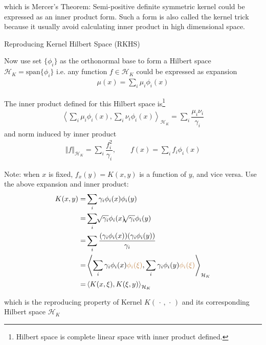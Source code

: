     which is Mercer's Theorem: Semi-positive definite symmetric kernel could be expressed as an inner product form. Such a form is also called the kernel trick because it usually avoid calculating inner product in high dimensional space.
    
\begin{point}
    Reproducing Kernel Hilbert Space (RKHS)
\end{point}
    Now use set $ \{\phi _i\} $ as the orthonormal base to form a Hilbert space $ \mathcal{H}_K=\mathrm{span}\{\phi _i\}  $ i.e. any function $ f\in\mathcal{H}_K $ could be expressed as expansion
    \begin{align}
        \mu (x)=\sum_{i} \mu _i\phi _i(x)
    \end{align}

    The inner product defined for this Hilbert space is\footnote{Hilbert space is complete linear space with inner product defined.}
    \begin{align}
        \left\langle \sum_{i}\mu _i\phi _i(x), \sum_{i}\nu _i\phi _i(x)\right\rangle _{\mathcal{H}_K} = \sum_{i}\dfrac{\mu _i\nu _i}{\gamma _i}
    \end{align}
    and norm induced by inner product
    \begin{align}
        \left\Vert f \right\Vert _{\mathcal{H}_K}=\sum_{i}\dfrac{f_i^2}{\gamma _i},\qquad f(x)=\sum_{i}f_i\phi _i(x)
    \end{align}
    
    
    
    Note: when $ x $ is fixed, $ f_x(y)= K(x,y) $ is a function of $ y $, and vice versa. Use the above expansion and inner product:
    \begin{align}
        K(x,y)=& \sum_{i}\gamma _i\phi _i(x)\phi _i(y)\\
        =&\sum_{i}\sqrt[]{\gamma _i}\phi _i(x)\sqrt[]{\gamma _i}\phi _i(y)\\
        =&\sum_{i}\dfrac{(\gamma _i\phi _i(x))(\gamma _i\phi _i(y))}{\gamma _i}\\
        =&\left\langle \sum_{i}\gamma _i\phi _i(x){\color{brown} \phi _i(\xi )},\sum_{i}\gamma _i\phi _i(y){\color{brown} \phi _i(\xi )} \right\rangle _{\mathcal{H}_K}\\
        =&\left\langle K(x,\xi ),K(\xi ,y) \right\rangle _{\mathcal{H}_K}
    \end{align}

        which is the reproducing property of Kernel $ K(\,\cdot\,,\,\cdot\,) $ and its corresponding Hilbert space $ \mathcal{H}_K $
    
